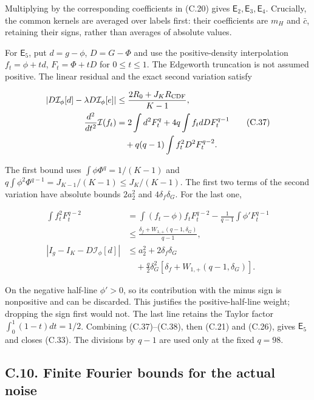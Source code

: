 \documentclass{article}
\begin{document}
Multiplying by the corresponding coefficients in (C.20) gives
\(\mathsf E_2,\mathsf E_3,\mathsf E_4\). Crucially, the common kernels
are averaged over labels first: their coefficients are \(m_H\) and
\(\bar c\), retaining their signs, rather than averages of absolute
values.

For \(\mathsf E_5\), put \(d=g-\phi\), \(D=G-\Phi\) and use the
positive-density interpolation \(f_t=\phi+td\), \(F_t=\Phi+tD\) for
\(0\le t\le1\). The Edgeworth truncation is not assumed positive. The
linear residual and the exact second variation satisfy

\[
\begin{aligned}
|D\mathcal I_\phi[d]-\lambda D\mathcal I_\phi[e]|
&\le\frac{2R_0+J_KR_{\rm CDF}}{K-1},\\
\frac{d^2}{dt^2}\mathcal I(f_t)
&=2\int d^2F_t^q+4q\int f_tdDF_t^{q-1}\\
&\quad+q(q-1)\int f_t^2D^2F_t^{q-2}.
\end{aligned}
\tag{C.37}
\]

The first bound uses \(\int\phi\Phi^q=1/(K-1)\) and
\(q\int\phi^2\Phi^{q-1}=J_{K-1}/(K-1)\le J_K/(K-1)\). The first two
terms of the second variation have absolute bounds \(2a_2^2\) and
\(4\delta_f\delta_G\). For the last one,

\[
\begin{aligned}
\int f_t^2F_t^{q-2}
&=\int(f_t-\phi)f_tF_t^{q-2}-\frac1{q-1}\int\phi'F_t^{q-1}\\
&\le\frac{\delta_f+W_{1,+}(q-1,\delta_G)}{q-1},\\
|I_g-I_K-D\mathcal I_\phi[d]|
&\le a_2^2+2\delta_f\delta_G\\
&\quad+\frac q2\delta_G^2[\delta_f+W_{1,+}(q-1,\delta_G)].
\end{aligned}
\tag{C.38}
\]

On the negative half-line \(\phi'>0\), so its contribution with the
minus sign is nonpositive and can be discarded. This justifies the
positive-half-line weight; dropping the sign first would not. The last
line retains the Taylor factor \(\int_0^1(1-t)dt=1/2\). Combining
(C.37)--(C.38), then (C.21) and (C.26), gives \(\mathsf E_5\) and closes
(C.33). The divisions by \(q-1\) are used only at the fixed \(q=98\).

\subsection*{C.10. Finite Fourier bounds for the actual
noise}\label{c.10.-finite-fourier-bounds-for-the-actual-noise}
\end{document}
